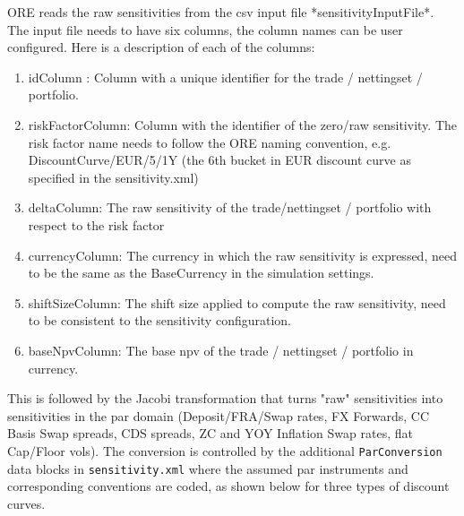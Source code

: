 ORE reads the raw sensitivities from the csv input file *sensitivityInputFile*. The input file needs to have six  columns, the column names can be user configured. Here is a description of each of the columns:

\begin{enumerate}
\item idColumn : Column with a unique identifier for the trade / nettingset / portfolio.
\item riskFactorColumn: Column with the identifier of the zero/raw sensitivity. The risk factor name needs to follow the ORE naming convention, e.g. DiscountCurve/EUR/5/1Y (the 6th bucket in EUR discount curve as specified in the sensitivity.xml)\
\item deltaColumn: The raw sensitivity of the trade/nettingset / portfolio with respect to the risk factor
\item currencyColumn: The currency in which the raw sensitivity is expressed, need to be the same as the BaseCurrency in the simulation settings.
\item shiftSizeColumn: The shift size applied to compute the raw sensitivity, need to be consistent to the sensitivity configuration.
\item baseNpvColumn: The base npv of the trade / nettingset / portfolio in currency.
\end{enumerate}

This is followed by the Jacobi transformation that turns "raw" sensitivities  into sensitivities in the par domain (Deposit/FRA/Swap rates, FX Forwards, CC Basis Swap spreads, 
CDS spreads, ZC and YOY Inflation Swap rates, flat Cap/Floor vols). The conversion is controlled by the additional {\tt ParConversion} data blocks 
in {\tt sensitivity.xml} where the assumed par instruments and corresponding conventions are coded, as shown below for three types of discount curves.

